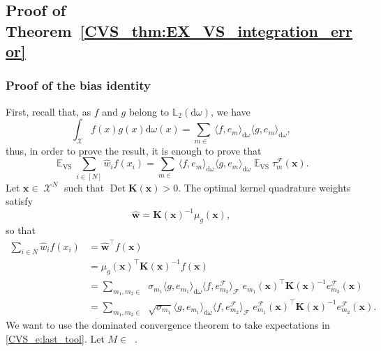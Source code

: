 \documentclass[twoside,11pt]{book}
\numberwithin{theorem}{chapter}
\numberwithin{definition}{chapter}
\numberwithin{proposition}{chapter}
\numberwithin{corollary}{chapter}
\numberwithin{example}{chapter}
\numberwithin{lemma}{chapter}
\numberwithin{assumption}{chapter}
\numberwithin{equation}{chapter}
\numberwithin{figure}{chapter}
\DeclareMathOperator{\Det}{Det}
\DeclareMathOperator{\VS}{\mathrm{VS}}
\DeclareMathOperator{\Tran}{\intercal}
\DeclareMathOperator{\EX}{\mathbb{E}}
\DeclareMathOperator{\F}{\mathcal{F}}
\DeclareMathOperator{\X}{\mathcal{X}}
\def\Ltwo{\mathbb{L}_{2}(\mathrm{d} \omega)}
\DeclareMathOperator{\Ns}{\mathbb{N}^{*}}
\newcommand{\rb}[1]{\textcolor{magenta}{#1}}
\begin{document}
\subsection{Proof of Theorem~\ref{CVS_thm:EX_VS_integration_error}}\label{CVS_app:proof_bias}
\subsubsection{Proof of the bias identity}
First, recall that, as $f$ and $g$ belong to $\Ltwo$, we have
\begin{equation}
\int_{\X}f(x)g(x) \mathrm{d}\omega(x) = \sum\limits_{m \in \Ns} \langle f,e_{m}\rangle_{\mathrm{d}\omega} \langle g,e_{m}\rangle_{\mathrm{d}\omega},
\end{equation}
thus, in order to prove the result, it is enough to prove that
\begin{equation}\label{CVS_eq:EX_VS_optimal_quadrature_formula}
\EX_{\VS} \sum\limits_{i \in [N]} \widehat{w}_{i}f(x_{i}) = \sum\limits_{m \in \Ns} \langle f,e_{m} \rangle_{\mathrm{d}\omega} \langle g,e_{m} \rangle_{\mathrm{d}\omega} \EX_{\VS}\tau_{m}^{\F}(\bm{x}).
\end{equation}
Let $\bm{x} \in \X^{N}$ such that $\Det \bm{K}(\bm{x})>0$. The optimal kernel quadrature weights satisfy
\begin{equation}
\widehat{\bm{w}} = \bm{K}(\bm{x})^{-1}\mu_{g}(\bm{x}),
\end{equation}
so that
\begin{align}
\sum\limits_{i \in N} \widehat{w}_{i}f(x_{i}) & = \widehat{\bm{w}}^{\Tran} f(\bm{x}) \\
& = \mu_{g}(\bm{x})^{\Tran} \bm{K}(\bm{x})^{-1} f(\bm{x})\\
& = \sum_{m_{1},m_{2} \in \Ns} \sigma_{m_{1}} \langle g, e_{m_{1}} \rangle_{\mathrm{d}\omega} \langle f, e_{m_{2}}^{\F} \rangle_{\F} \; e_{m_{1}}(\bm{x})^{\Tran} \bm{K}(\bm{x})^{-1}e_{m_{2}}^{\F}(\bm{x}) \\
& = \sum\limits_{m_{1},m_{2} \in \Ns} \sqrt{\sigma_{m_{1}}} \langle g, e_{m_{1}} \rangle_{\mathrm{d}\omega}  \langle f, e_{m_{2}}^{\F} \rangle_{\F}\;  e_{m_{1}}^{\F}(\bm{x})^{\Tran} \bm{K}(\bm{x})^{-1}e_{m_{2}}^{\F}(\bm{x}).
\label{CVS_e:last_tool}
\end{align}
We want to use the dominated convergence theorem to take expectations in \eqref{CVS_e:last_tool}.
Let $M \in \Ns$.
\end{document}
